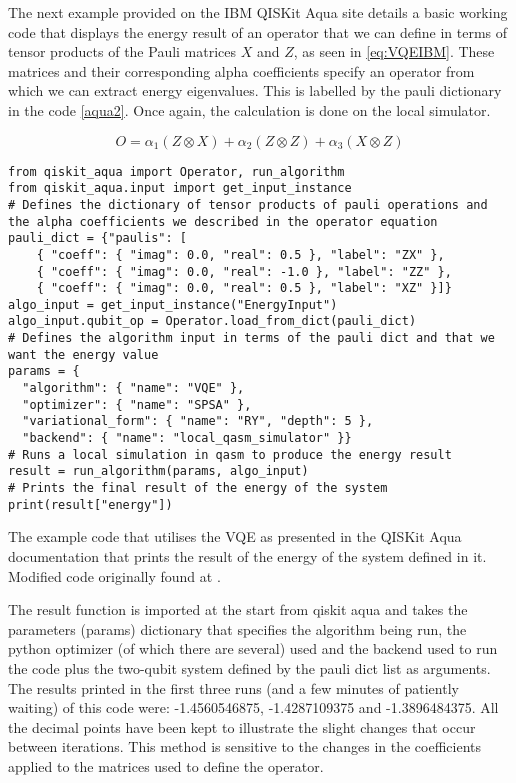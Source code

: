 The next example provided on the IBM QISKit Aqua site details a basic working code that displays the energy result of an operator that we can define in terms of tensor products of the Pauli matrices $X$ and $Z$, as seen in \autoref{eq:VQEIBM}. These matrices and their corresponding alpha coefficients specify an operator from which we can extract energy eigenvalues. This is labelled by the pauli dictionary in the code \autoref{aqua2}. Once again, the calculation is done on the local simulator. 

\begin{equation}
    O = \alpha_{1} \left(Z \otimes X\right) + \alpha_{2} \left(Z \otimes Z\right) + \alpha_{3} \left(X \otimes Z\right)
    \label{eq:VQEIBM}
\end{equation}

\begin{listing}[H]
\begin{verbatim}
from qiskit_aqua import Operator, run_algorithm
from qiskit_aqua.input import get_input_instance
# Defines the dictionary of tensor products of pauli operations and the alpha coefficients we described in the operator equation
pauli_dict = {"paulis": [
    { "coeff": { "imag": 0.0, "real": 0.5 }, "label": "ZX" },
    { "coeff": { "imag": 0.0, "real": -1.0 }, "label": "ZZ" },
    { "coeff": { "imag": 0.0, "real": 0.5 }, "label": "XZ" }]}
algo_input = get_input_instance("EnergyInput")
algo_input.qubit_op = Operator.load_from_dict(pauli_dict)
# Defines the algorithm input in terms of the pauli dict and that we want the energy value
params = {
  "algorithm": { "name": "VQE" },
  "optimizer": { "name": "SPSA" },
  "variational_form": { "name": "RY", "depth": 5 },
  "backend": { "name": "local_qasm_simulator" }}
# Runs a local simulation in qasm to produce the energy result
result = run_algorithm(params, algo_input)
# Prints the final result of the energy of the system
print(result["energy"])
\end{verbatim}
\caption{The example code that utilises the VQE as presented in the QISKit Aqua documentation that prints the result of the energy of the system defined in it. Modified code originally found at \cite{QISKitAqua}.}
\label{aqua2}
\end{listing}

The result function is imported at the start from qiskit aqua and takes the parameters (params) dictionary that specifies the algorithm being run, the python optimizer (of which there are several) used and the backend used to run the code plus the two-qubit system defined by the pauli dict list as arguments. The results printed in the first three runs (and a few minutes of patiently waiting) of this code were: -1.4560546875, -1.4287109375 and -1.3896484375. All the decimal points have been kept to illustrate the slight changes that occur between iterations. This method is sensitive to the changes in the coefficients applied to the matrices used to define the operator. 

